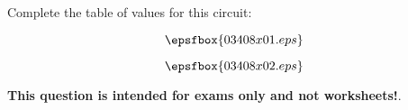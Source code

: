

Complete the table of values for this circuit:

$$\epsfbox{03408x01.eps}$$







$$\epsfbox{03408x02.eps}$$







{\bf This question is intended for exams only and not worksheets!}.



